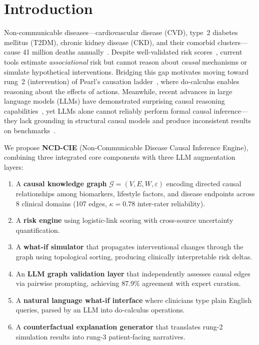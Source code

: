 \documentclass[runningheads]{llncs}
\begin{document}
\section{Introduction}\label{sec:intro}

Non-communicable diseases---cardiovascular disease (CVD), type~2
diabetes mellitus (T2DM), chronic kidney disease (CKD), and their
comorbid clusters---cause 41 million deaths
annually~\cite{who2021ncd}.
Despite well-validated risk scores~\cite{dagostino2008,hippisley2017qrisk3,score22021},
current tools estimate \emph{associational} risk but cannot reason about
\emph{causal} mechanisms or simulate hypothetical interventions.
Bridging this gap motivates moving toward rung~2 (intervention)
of Pearl's causation ladder~\cite{pearl2018book}, where
do-calculus enables reasoning about the effects of actions.
Meanwhile, recent advances in large language models (LLMs) have
demonstrated surprising causal reasoning
capabilities~\cite{ma2024causal,kiciman2023causal}, yet LLMs alone
cannot reliably perform formal causal inference---they lack grounding
in structural causal models and produce inconsistent results on
benchmarks~\cite{jin2023cladder}.

We propose \textbf{NCD-CIE} (Non-Communicable Disease Causal Inference
Engine), combining three integrated core components with three
LLM augmentation layers:
\begin{enumerate}
\item A \textbf{causal knowledge graph} $\mathcal{G}=(V,E,W,\varepsilon)$
  encoding directed causal relationships among biomarkers, lifestyle
  factors, and disease endpoints across 8 clinical domains
  (107 edges, $\kappa=0.78$ inter-rater reliability).
\item A \textbf{risk engine} using logistic-link scoring with
  cross-source uncertainty quantification.
\item A \textbf{what-if simulator} that propagates
  interventional changes through the graph using topological sorting,
  producing clinically interpretable risk deltas.
\item An \textbf{LLM graph validation layer} that independently
  assesses causal edges via pairwise prompting, achieving 87.9\%
  agreement with expert curation.
\item A \textbf{natural language what-if interface} where clinicians
  type plain English queries, parsed by an LLM into do-calculus
  operations.
\item A \textbf{counterfactual explanation generator} that translates
  rung-2 simulation results into rung-3 patient-facing narratives.
\end{enumerate}
\end{document}
